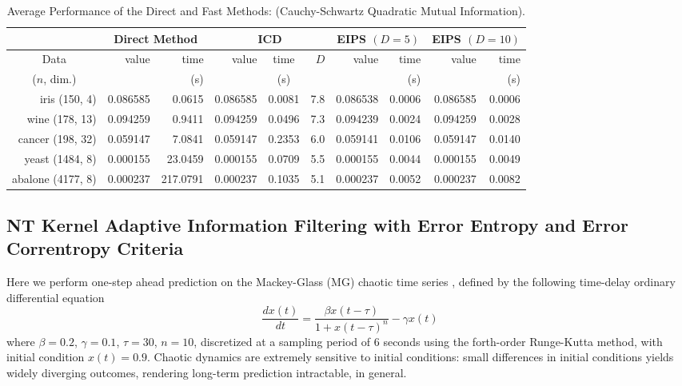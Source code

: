 \documentclass[8pt,twocolumn]{IEEEtran}
\newcommand{\cmmnt}[1]{}
\begin{document}
\begin{table}[ht]\renewcommand{\arraystretch}{1.5}
	\tiny
	\centering\caption{Average Performance of the Direct and Fast Methods: (Cauchy-Schwartz Quadratic Mutual Information).}
	\label{tab:QMI-CS}
	\setlength\tabcolsep{1.4pt}
	\begin{tabular}{ |r|r r|r c r|r r|r r|}
		\cline{2-10}		
		\multicolumn{1}{c|}{}& \multicolumn{2}{c|}{\scriptsize Direct Method} & \multicolumn{3}{c|}{\scriptsize ICD} & \multicolumn{2}{c|}{{\scriptsize EIPS} $(D=5)$}& \multicolumn{2}{c|}{{\scriptsize EIPS} $(D=10)$}\\\hline
		\multicolumn{1}{|c|}{\scriptsize Data} &\scriptsize value  & \scriptsize time &\scriptsize  value  &\scriptsize time & $D$ & \scriptsize value  &\scriptsize time &\scriptsize  value  &\scriptsize time\\
		\multicolumn{1}{|c|}{($n$, dim.)}&\scriptsize & \scriptsize (s) &\scriptsize  &\scriptsize (s) &  & \scriptsize &\scriptsize (s) &\scriptsize  &\scriptsize (s)\\ \hline\hline
		{\scriptsize	iris} (150, 4) & 0.086585  &  0.0615 & 0.086585  &  0.0081 & \cmmnt{D} 7.8 & 0.086538  &  0.0006
		 & 0.086585  &  0.0006\\ \hline		
		{\scriptsize	wine} (178, 13)&0.094259  &  0.9411&0.094259  &  0.0496& \cmmnt{D} 7.3 &0.094239  &  0.0024 &0.094259   & 0.0028\\ \hline
		{\scriptsize	cancer} (198, 32) &0.059147  &  7.0841&0.059147  &  0.2353 & \cmmnt{D} 6.0 &0.059141  &  0.0106&0.059147   & 0.0140\\ \hline		
		{\scriptsize	yeast} (1484, 8) &0.000155 &  23.0459&0.000155  &  0.0709 & \cmmnt{D} 5.5 &0.000155  &  0.0044 & 0.000155    & 0.0049\\ \hline
		{\scriptsize	abalone} (4177, 8)  &0.000237 & 217.0791 &0.000237  &  0.1035 & \cmmnt{D} 5.1 &0.000237  &  0.0052&0.000237  &  0.0082
		\\ \hline
	\end{tabular}
	\normalsize
\end{table}

\subsection{NT Kernel Adaptive Information Filtering with Error Entropy and Error Correntropy Criteria}
Here we perform one-step ahead prediction on the Mackey-Glass (MG) chaotic time series \cite{Mackey77}, defined by the following time-delay ordinary differential equation
\begin{equation*}
\frac{d x(t)}{d t} =\frac{\beta x(t-\tau)}{1+x(t-\tau)^{n}} -\gamma x(t)
\end{equation*}
where $\beta=0.2$, $\gamma=0.1$, $\tau=30$, $n=10$, discretized at a sampling period of 6 seconds using the forth-order Runge-Kutta method, with initial condition $x(t) = 0.9$. Chaotic dynamics are extremely sensitive to initial conditions: small differences in initial conditions yields widely diverging outcomes, rendering long-term prediction intractable, in general. 
\end{document}
